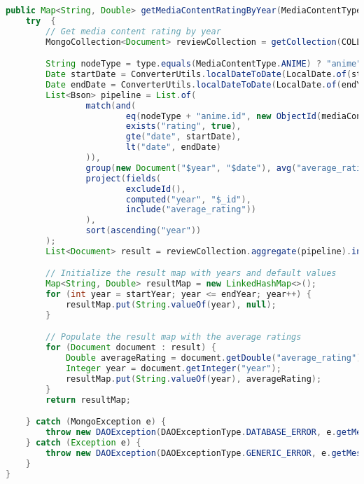 \begin{mdframed}[style=customstyle]
\begin{lstlisting}[language=java]
public Map<String, Double> getMediaContentRatingByYear(MediaContentType type, String mediaContentId, int startYear, int endYear) throws  DAOException {
    try  {
        // Get media content rating by year
        MongoCollection<Document> reviewCollection = getCollection(COLLECTION_NAME);

        String nodeType = type.equals(MediaContentType.ANIME) ? "anime" : "manga";
        Date startDate = ConverterUtils.localDateToDate(LocalDate.of(startYear, 1, 1));
        Date endDate = ConverterUtils.localDateToDate(LocalDate.of(endYear + 1, 1, 1));
        List<Bson> pipeline = List.of(
                match(and(
                        eq(nodeType + "anime.id", new ObjectId(mediaContentId)),
                        exists("rating", true),
                        gte("date", startDate),
                        lt("date", endDate)
                )),
                group(new Document("$year", "$date"), avg("average_rating", "$rating")),
                project(fields(
                        excludeId(),
                        computed("year", "$_id"),
                        include("average_rating"))
                ),
                sort(ascending("year"))
        );
        List<Document> result = reviewCollection.aggregate(pipeline).into(new ArrayList<>());

        // Initialize the result map with years and default values
        Map<String, Double> resultMap = new LinkedHashMap<>();
        for (int year = startYear; year <= endYear; year++) {
            resultMap.put(String.valueOf(year), null);
        }

        // Populate the result map with the average ratings
        for (Document document : result) {
            Double averageRating = document.getDouble("average_rating");
            Integer year = document.getInteger("year");
            resultMap.put(String.valueOf(year), averageRating);
        }
        return resultMap;

    } catch (MongoException e) {
        throw new DAOException(DAOExceptionType.DATABASE_ERROR, e.getMessage());
    } catch (Exception e) {
        throw new DAOException(DAOExceptionType.GENERIC_ERROR, e.getMessage());
    }
}\end{lstlisting}
\end{mdframed}
    
\newpage

